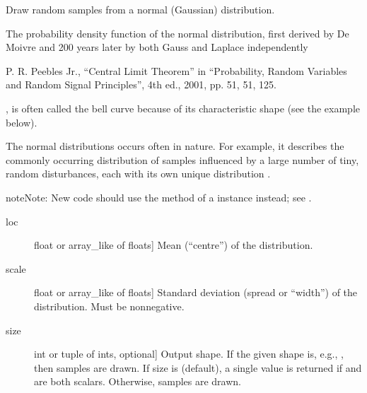 \documentclass[letterpaper,10pt,english]{sphinxmanual}
\begin{document}
\begin{fulllineitems}
\label{\detokenize{time_warping:time_warping.normal}}
Draw random samples from a normal (Gaussian) distribution.

The probability density function of the normal distribution, first
derived by De Moivre and 200 years later by both Gauss and Laplace
independently %
\begin{footnote}[2]\sphinxAtStartFootnote
P. R. Peebles Jr., “Central Limit Theorem” in “Probability,
Random Variables and Random Signal Principles”, 4th ed., 2001,
pp. 51, 51, 125.
%
\end{footnote}, is often called the bell curve because of
its characteristic shape (see the example below).

The normal distributions occurs often in nature.  For example, it
describes the commonly occurring distribution of samples influenced
by a large number of tiny, random disturbances, each with its own
unique distribution \sphinxfootnotemark[2].

\begin{sphinxadmonition}{note}{Note:}
New code should use the  method of a 
instance instead; see .
\end{sphinxadmonition}
\begin{description}
\item[{loc}] \leavevmode{[}float or array\_like of floats{]}
Mean (“centre”) of the distribution.

\item[{scale}] \leavevmode{[}float or array\_like of floats{]}
Standard deviation (spread or “width”) of the distribution. Must be
non\sphinxhyphen{}negative.

\item[{size}] \leavevmode{[}int or tuple of ints, optional{]}
Output shape.  If the given shape is, e.g., , then
 samples are drawn.  If size is  (default),
a single value is returned if  and  are both scalars.
Otherwise,  samples are drawn.


\end{description}
\end{fulllineitems}
\end{document}
